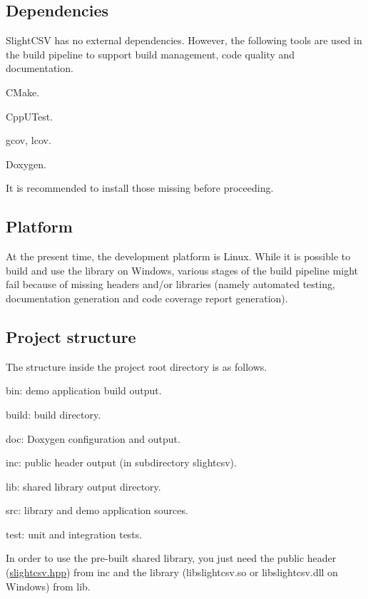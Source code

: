\subsection*{Dependencies}

Slight\+C\+SV has no external dependencies. However, the following tools are used in the build pipeline to support build management, code quality and documentation.


\begin{DoxyItemize}
\item C\+Make.
\item Cpp\+U\+Test.
\item gcov, lcov.
\item Doxygen.
\end{DoxyItemize}

It is recommended to install those missing before proceeding.

\subsection*{Platform}

At the present time, the development platform is Linux. While it is possible to build and use the library on Windows, various stages of the build pipeline might fail because of missing headers and/or libraries (namely automated testing, documentation generation and code coverage report generation).

\subsection*{Project structure}

The structure inside the project root directory is as follows.


\begin{DoxyItemize}
\item bin\+: demo application build output.
\item build\+: build directory.
\item doc\+: Doxygen configuration and output.
\item inc\+: public header output (in subdirectory slightcsv).
\item lib\+: shared library output directory.
\item src\+: library and demo application sources.
\item test\+: unit and integration tests.
\end{DoxyItemize}

In order to use the pre-\/built shared library, you just need the public header (\hyperlink{slightcsv_8hpp_source}{slightcsv.\+hpp}) from inc and the library (libslightcsv.\+so or libslightcsv.\+dll on Windows) from lib.

